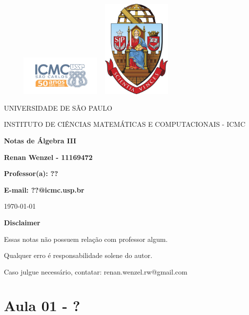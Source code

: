\documentclass{article}
\begin{document}
 \begin{figure}[ht]
   \includegraphics[width=4cm]{../icmc.png}
   \hspace{7cm}
   \includegraphics[height=4.9cm,width=4cm]{../brasao_usp_cor.jpg}
   \endminipage  
 \end{figure}

 \begin{center}
   \vspace{1cm}
   \LARGE
   UNIVERSIDADE DE S\~AO PAULO

   \vspace{1.3cm}
   \LARGE
   INSTITUTO DE CI\^ENCIAS MATEM\'ATICAS E COMPUTACIONAIS - ICMC

   \vspace{1.7cm}
   \Large
   \textbf{Notas de Álgebra III}

   \vspace{1.3cm}
   \large
   \textbf{Renan Wenzel - 11169472}

   \vspace{1.3cm}
   \large
   \textbf{Professor(a): ??}

   \textbf{E-mail: ??@icmc.usp.br}

   \vspace{1.3cm}
   \today
 \end{center}

 \newpage
 \textbf{{\Huge Disclaimer}}
 \vspace{5cm}

 {\huge Essas notas não possuem relação com professor algum. 

   Qualquer erro é responsabilidade solene do autor.

 Caso julgue necessário, contatar: renan.wenzel.rw@gmail.com}
 \tableofcontents

 \newpage

 \section{Aula 01 - ?}

 
\end{document}
